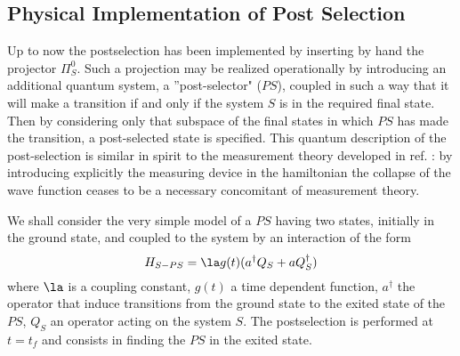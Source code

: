 \documentclass[12pt]{article}
\begin{document}
\subsection{Physical Implementation of Post Selection}

Up to now the postselection has been implemented by
inserting by hand
the projector $\Pi^0_S$.
Such a projection may be
realized operationally by introducing
an additional
quantum
system, a ''post-selector" ($PS$),
coupled in such a way
 that it will make a transition if and only if the system $S$
is in the required final state. Then by considering
only that subspace of the
final states in which $PS$ has made the
transition, a post-selected state is specified. This
quantum description of the
post-selection
is similar in spirit to the measurement theory developed in ref.
\cite{Vonn}: by introducing explicitly the measuring device in the
hamiltonian the collapse of the wave function ceases to be a necessary
concomitant of measurement theory.

We shall consider the very simple model of a $PS$ having two states,
initially in the ground state, and coupled to the system by an interaction
of the form \begin{equation}
H_{S-PS} = \la g(t) ( a^\dagger Q_S + a Q_S^\dagger)
\label{weakx}
\end{equation}
where $\la$ is a
coupling constant, $g(t)$ a time dependent function, $a^\dagger$  the operator
that induce transitions from the ground state to the exited state of the
$PS$, $Q_S$ an operator acting on the system $S$. The
postselection is performed at $t=t_f$ and consists in finding the $PS$ in the
exited state.
\end{document}
